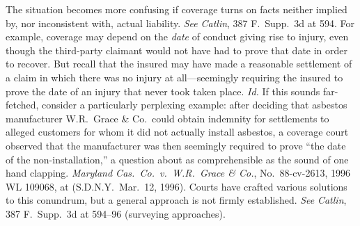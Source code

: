 \documentclass[
  12pt,
  letterpaper,
]{scrartcl}
\begin{document}
The situation becomes more confusing if coverage turns on facts neither implied
by, nor inconsistent with, actual liability.
\textit{See} \textit{Catlin}, 387 F.~Supp.~3d at 594. For example, coverage may
depend on the \textit{date} of conduct giving rise to injury, even though the third-party claimant would not have had to prove that date in order to recover. But recall that the insured may have made a reasonable settlement of a claim in which there was no injury at all---seemingly requiring the insured to
prove the date of an injury that never took taken place.
 \textit{Id.} If this sounds far-fetched, consider a particularly perplexing example: after deciding that asbestos manufacturer
W.R.~Grace \& Co.~could obtain indemnity for settlements to alleged customers
for whom it did not actually install asbestos, a coverage court observed that the
manufacturer was then seemingly required to prove ``the date of the
non-installation,'' a question about as comprehensible as the sound of one hand
clapping. \textit{Maryland Cas.~Co.~v.~W.R.~Grace \& Co.}, No.~88-cv-2613, 1996
WL 109068, at  (S.D.N.Y.~Mar.~12, 1996). Courts have crafted various
solutions to this conundrum, but a general approach is not firmly established.
\textit{See} \textit{Catlin}, 387 F.~Supp.~3d at 594--96 (surveying
approaches).
\end{document}
